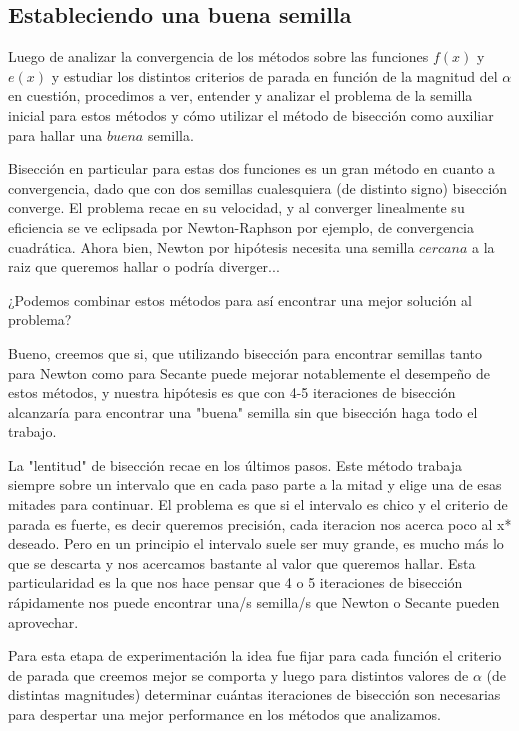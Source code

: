 \subsection{Estableciendo una buena semilla}

Luego de analizar la convergencia de los métodos sobre las funciones $f(x)$ y $e(x)$ y estudiar los distintos criterios de parada en función de la magnitud del $\alpha$ en cuestión, procedimos a ver, entender y analizar el problema de la semilla inicial para estos métodos y cómo utilizar el método de bisección como auxiliar para hallar una $buena$ semilla.

Bisección en particular para estas dos funciones es un gran método en cuanto a convergencia, dado que con dos semillas cualesquiera (de distinto signo) bisección converge. El problema recae en su velocidad, y al converger linealmente su eficiencia se ve eclipsada por Newton-Raphson por ejemplo, de convergencia cuadrática. Ahora bien, Newton por hipótesis necesita una semilla $cercana$ a la raiz que queremos hallar o podría diverger...

¿Podemos combinar estos métodos para así encontrar una mejor solución al problema?

Bueno, creemos que si, que utilizando bisección para encontrar semillas tanto para Newton como para Secante puede mejorar notablemente el desempeño de estos métodos, y nuestra hipótesis es que con 4-5 iteraciones de bisección alcanzaría para encontrar una "buena" semilla sin que bisección haga todo el trabajo.

La "lentitud" de bisección recae en los últimos pasos. Este método trabaja siempre sobre un intervalo que en cada paso parte a la mitad y elige una de esas mitades para continuar. El problema es que si el intervalo es chico y el criterio de parada es fuerte, es decir queremos precisión, cada iteracion nos acerca poco al x* deseado. Pero en un principio el intervalo suele ser muy grande, es mucho más lo que se descarta y nos acercamos bastante al valor que queremos hallar. Esta particularidad es la que nos hace pensar que 4 o 5 iteraciones de bisección rápidamente nos puede encontrar una/s semilla/s que Newton o Secante pueden aprovechar.

Para esta etapa de experimentación la idea fue fijar para cada función el criterio de parada que creemos mejor se comporta y luego para distintos valores de $\alpha$ (de distintas magnitudes) determinar cuántas iteraciones de bisección son necesarias para despertar una mejor performance en los métodos que analizamos.
